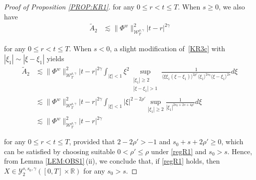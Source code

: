\documentclass[letterpaper, 11pt,  reqno]{amsart}
\DeclareMathOperator*{\intt}{\int}
\newcommand{\1}{\hspace{0.5mm}\text{I}\hspace{0.5mm}}
\newcommand{\noi}{\noindent}
\newcommand{\R}{\mathbb{R}}
\newcommand{\g}{\gamma}
\newcommand{\wt}{\widetilde}
\newcommand{\les}{\lesssim}
\newcommand{\jb}[1]
{\langle #1 \rangle}
\newcommand{\cY}{\mathcal{Y}}
\newcommand{\W}{\mathcal{W}}
\numberwithin{equation}{section}
\numberwithin{theorem}{section}
\begin{document}
\begin{proof}[Proof of Proposition \ref{PROP:KR1}]
\noi
for any $0 \le r <  t \le T$.
When $s \ge 0$, we also have 
\begin{align*}
\wt A_2
& \les
\|\Phi^w\|^2_{\W_T^{\rho,\g}}|t-r |^{2\g}
\end{align*}

\noi
for any $0 \le r <  t \le T$.
When $s < 0$, 
a slight modification of~\eqref{KR3c} with $|\xi_1|\sim |\xi - \xi_1|$ yields
\begin{align*}
\wt A_2
& \les
\|\Phi^w\|_{\W^{\rho,\g}_T}^2
|t-r|^{2\g}
\intt_{|\xi|<1}  \xi^2 
\sup_{\substack{|\xi_1|\ge 2\\|\xi - \xi_1|> 1}}
\frac{1}{\jb {\xi \xi_1 (\xi-\xi_1)}^{2\rho'}\jb {\xi_1}^{2s_0} \jb {\xi-\xi_1}^{2s}} d\xi
\\
& \les 
\|\Phi^w\|_{\W^{\rho,\g}_T}^2
|t-r|^{2\g}
\intt_{|\xi|<1} |\xi|^{2-2\rho' } 
\sup_{|\xi_1|\ge 2}
\frac{1}{| \xi_1|^{2s_0+2s + 4\rho'} } d\xi\\
& \les 
\|\Phi^w\|_{\W^{\rho,\g}_T}^2
|t-r|^{2\g} 
\end{align*}

\noi
for any $0 \le r <  t \le T$, 
provided that $2-2\rho'>-1$ and $ s_0 + s+2\rho' \ge 0$, 
which can be satisfied by choosing 
suitable $0 < \rho' \le \rho$
under  \eqref{regR1} and  $s_0 > s$.
Hence,
from  Lemma \ref{LEM:OBS1}\,(ii),  
we conclude that, if \eqref{regR1} holds, 
then
 $X\in  \cY^{s, s_0, \g}_2([0, T]\times \R)$
 for any $s_0 > s$.
\end{proof}
\end{document}
